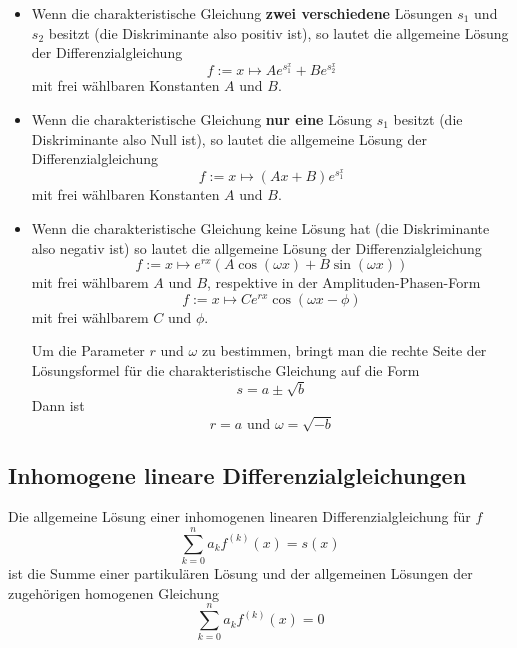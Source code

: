 \documentclass[10pt,a4paper]{scrartcl}
\begin{document}
\begin{itemize}

\item Wenn die charakteristische Gleichung \textbf{zwei verschiedene} Lösungen
$s_1$ und $s_2$ besitzt (die Diskriminante also positiv ist), so lautet die
allgemeine Lösung der Differenzialgleichung
$$f := x \mapsto Ae^{s_1^x} + Be^{s_2^x}$$
mit frei wählbaren Konstanten $A$ und $B$.

\item Wenn die charakteristische Gleichung \textbf{nur eine} Lösung $s_1$ besitzt
(die Diskriminante also Null ist), so lautet die allgemeine Lösung der Differenzialgleichung
$$f := x \mapsto (Ax + B)e^{s_1^x}$$
mit frei wählbaren Konstanten $A$ und $B$.

\item Wenn die charakteristische Gleichung keine Lösung hat (die Diskriminante
also negativ ist) so lautet die allgemeine Lösung der Differenzialgleichung
$$f := x \mapsto e^{rx}\left(A \cos(\omega x) + B \sin(\omega x)\right)$$
mit frei wählbarem $A$ und $B$, respektive in der Amplituden-Phasen-Form
$$f := x \mapsto Ce^{rx} \cos(\omega x - \phi)$$
mit frei wählbarem $C$ und $\phi$.

Um die Parameter $r$ und $\omega$ zu bestimmen, bringt man die rechte Seite der
Lösungsformel für die charakteristische Gleichung auf die Form
$$s = a \pm \sqrt{b}$$
Dann ist
$$r = a \textrm{ und } \omega = \sqrt{-b}$$
\end{itemize}


\subsection{Inhomogene lineare Differenzialgleichungen}

Die allgemeine Lösung einer inhomogenen linearen Differenzialgleichung für $f$
$$\sum_{k=0}^n a_k f^{(k)}(x) = s(x)$$
ist die Summe einer partikulären Lösung und der allgemeinen Lösungen
der zugehörigen homogenen Gleichung
$$\sum_{k=0}^n a_k f^{(k)}(x) = 0$$
\end{document}
